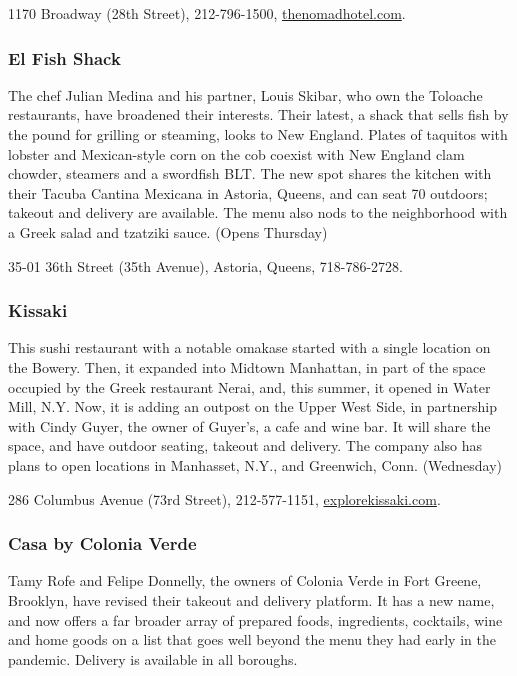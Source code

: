 1170 Broadway (28th Street), 212-796-1500,
\href{https://www.thenomadhotel.com/}{thenomadhotel.com}.

\hypertarget{el-fish-shack-}{%
\subsubsection{El Fish Shack }\label{el-fish-shack-}}

The chef Julian Medina and his partner, Louis Skibar, who own the
Toloache restaurants, have broadened their interests. Their latest, a
shack that sells fish by the pound for grilling or steaming, looks to
New England. Plates of taquitos with lobster and Mexican-style corn on
the cob coexist with New England clam chowder, steamers and a swordfish
BLT. The new spot shares the kitchen with their Tacuba Cantina Mexicana
in Astoria, Queens, and can seat 70 outdoors; takeout and delivery are
available. The menu also nods to the neighborhood with a Greek salad and
tzatziki sauce. (Opens Thursday)

35-01 36th Street (35th Avenue), Astoria, Queens, 718-786-2728.

\hypertarget{kissaki-}{%
\subsubsection{Kissaki }\label{kissaki-}}

This sushi restaurant with a notable omakase started with a single
location on the Bowery. Then, it expanded into Midtown Manhattan, in
part of the space occupied by the Greek restaurant Nerai, and, this
summer, it opened in Water Mill, N.Y. Now, it is adding an outpost on
the Upper West Side, in partnership with Cindy Guyer, the owner of
Guyer's, a cafe and wine bar. It will share the space, and have outdoor
seating, takeout and delivery. The company also has plans to open
locations in Manhasset, N.Y., and Greenwich, Conn. (Wednesday)

286 Columbus Avenue (73rd Street), 212-577-1151,
\href{https://explorekissaki.com/}{explorekissaki.com}.

\hypertarget{casa-by-colonia-verde-}{%
\subsubsection{Casa by Colonia Verde }\label{casa-by-colonia-verde-}}

Tamy Rofe and Felipe Donnelly, the owners of Colonia Verde in Fort
Greene, Brooklyn, have revised their takeout and delivery platform. It
has a new name, and now offers a far broader array of prepared foods,
ingredients, cocktails, wine and home goods on a list that goes well
beyond the menu they had early in the pandemic. Delivery is available in
all boroughs.

